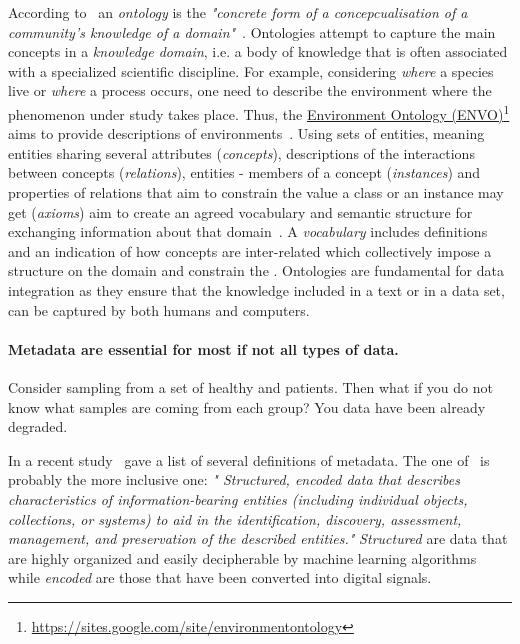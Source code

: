      According to~\citeauthor{stevens2000ontology} an \textit{ontology} is the \textit{"concrete form of a concepcualisation
      of a community's knowledge of a domain"}~\citep{stevens2000ontology}.
      Ontologies attempt to capture the main concepts in a \textit{knowledge domain}, 
      i.e. a body of knowledge that is often associated with a
      specialized scientific discipline. 
      For example, considering \textit{where} a species live or \textit{where} a process occurs, one need to describe the environment where the phenomenon under study 
      takes place. 
      Thus, the \href{https://sites.google.com/site/environmentontology}{Environment Ontology (ENVO)}\footnote{\href{https://sites.google.com/site/environmentontology}{https://sites.google.com/site/environmentontology}} aims to provide descriptions of environments~\citep{buttigieg2016environment}.
      Using sets of entities, meaning entities sharing several attributes (\textit{concepts}), 
      descriptions of the interactions between concepts (\textit{relations}), 
      entities - members of a concept (\textit{instances}) and 
      properties of relations that aim to constrain the value a class or an instance may get (\textit{axioms}) aim to create an agreed vocabulary and
      semantic structure for exchanging
      information about that domain~\citep{stevens2000ontology}. 
      A \textit{vocabulary} includes definitions and an indication of how concepts are inter-related which collectively impose a structure on the domain and constrain the
      \citep{uschold1998enterprise}.
      Ontologies are fundamental for data integration as they ensure that the knowledge
      included in a text or in a data set, can be captured by both humans and computers. 


      \paragraph{Metadata are essential for most if not all types of data.} 
      Consider sampling from a set of healthy and patients. 
      Then what if you do not know what samples are coming from each group? 
      You data have been already degraded. 

      In a recent study~\citeauthor{furner2020definitions} gave a list of several definitions of metadata.
      The one of~\citeauthor{zeng_qin_2016} is probably the more inclusive one:
      \textit{"
      Structured, encoded data that describes characteristics of information-bearing entities
      (including individual objects, collections, or systems) to aid in the identification,
      discovery, assessment, management, and preservation of the described entities."
      }
      \textit{Structured} are data that are highly organized and easily decipherable by machine learning algorithms while
      \textit{encoded} are those that have been converted into digital signals.

